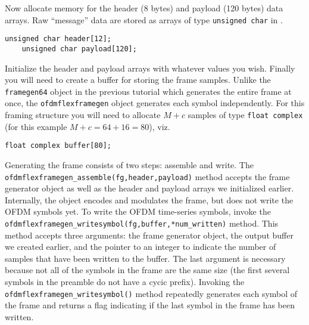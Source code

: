 Now allocate memory for the header (8 bytes) and payload (120 bytes)
data arrays.
Raw ``message'' data are stored as arrays of type {\tt unsigned char} in
\liquid.
%
\begin{Verbatim}[fontsize=\small]
    unsigned char header[12];
    unsigned char payload[120];
\end{Verbatim}
%
Initialize the header and payload arrays with whatever values you wish.
%
Finally you will need to create a buffer for storing the frame samples.
Unlike the {\tt framegen64} object in the previous tutorial which
generates the entire frame at once,
the {\tt ofdmflexframegen} object generates each symbol independently.
For this framing structure you will need to allocate $M+c$ samples of
type {\tt float complex} (for this example $M+c = 64+16 = 80$), viz.
%
\begin{Verbatim}[fontsize=\small]
    float complex buffer[80];
\end{Verbatim}

Generating the frame consists of two steps: assemble and write.
The {\tt ofdmflexframegen\_assemble(fg,header,payload)} method accepts
the frame generator object as well as the header and payload arrays we
initialized earlier.
Internally, the object encodes and modulates the frame, but does not
write the OFDM symbols yet.
To write the OFDM time-series symbols, invoke the
{\tt ofdmflexframegen\_writesymbol(fg,buffer,*num\_written)} method.
This method accepts three arguments:
  the frame generator object,
  the output buffer we created earlier,
  and the pointer to an integer to indicate the number of samples that
  have been written to the buffer.
The last argument is necessary because not all of the symbols in the
frame are the same size (the first several symbols in the preamble do
not have a cycic prefix).
Invoking the {\tt ofdmflexframegen\_writesymbol()} method repeatedly
generates each symbol of the frame
and returns a flag indicating if the last symbol in the frame has been
written.

